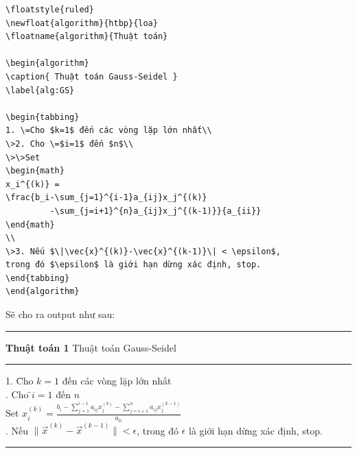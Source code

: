 \documentclass[a4paper]{report}
\begin{document}
\begin{code}
\begin{verbatim}
\floatstyle{ruled}
\newfloat{algorithm}{htbp}{loa}
\floatname{algorithm}{Thuật toán}

\begin{algorithm}
\caption{ Thuật toán Gauss-Seidel }
\label{alg:GS}

\begin{tabbing}
1. \=Cho $k=1$ đến các vòng lặp lớn nhất\\
\>2. Cho \=$i=1$ đến $n$\\
\>\>Set 
\begin{math}
x_i^{(k)} = 
\frac{b_i-\sum_{j=1}^{i-1}a_{ij}x_j^{(k)}
         -\sum_{j=i+1}^{n}a_{ij}x_j^{(k-1)}}{a_{ii}}
\end{math}
\\
\>3. Nếu $\|\vec{x}^{(k)}-\vec{x}^{(k-1)}\| < \epsilon$, 
trong đó $\epsilon$ là giới hạn dừng xác định, stop.
\end{tabbing}
\end{algorithm}
\end{verbatim}
\end{code}%
\noindent Sẽ cho ra output như sau:
\begin{center}
\begin{latexonly}
\begin{minipage}{\textwidth}
\hrule height.8pt depth0pt \kern2pt
\noindent\textbf{Thuật toán 1}  Thuật toán Gauss-Seidel \par
\kern2pt\hrule\kern2pt
\begin{tabbing}
1. \=Cho $k=1$ đến các vòng lặp lớn nhất\\
. Cho \=$i=1$ đến $n$\\
\>\>Set 
\begin{math}
x_i^{(k)} = 
\frac{b_i-\sum_{j=1}^{i-1}a_{ij}x_j^{(k)}
         -\sum_{j=i+1}^{n}a_{ij}x_j^{(k-1)}}{a_{ii}}
\end{math}
\\
. Nếu $\|\vec{x}^{(k)}-\vec{x}^{(k-1)}\| < \epsilon$, 
trong đó $\epsilon$ là giới hạn dừng xác định, stop.
\end{tabbing}
\kern2pt\hrule\relax
\end{minipage}
\end{latexonly}
\end{center}
\end{document}
